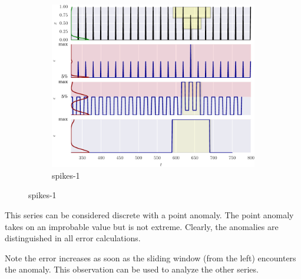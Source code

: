 
\begin{figure}[!hp] %
    \centering
  
  \begin{subfigure}[t]{\textwidth}
        \centering
        \includegraphics[]{figs/er_spikelv.pdf}
        \caption{spikes-1}
    \end{subfigure}%

\end{figure}

This series can be considered discrete with a point anomaly.
%
The point anomaly takes on an improbable value but is not extreme.
%
Clearly, the anomalies are distinguished in all error calculations.

Note the error increases as soon as the sliding window (from the left) encounters the anomaly.
%
This observation can be used to analyze the other series.



